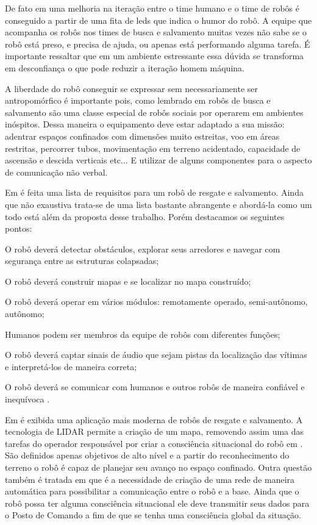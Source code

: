 \documentclass[
	article,			%
	11pt,				%
	oneside,			%
	a4paper,			%
	english,			%
	brazil,				%
	sumario=tradicional	
	]{abntex2}
\begin{document}
De fato em \cite{akgun2022using} uma melhoria na iteração entre o time humano e o time de robôs é conseguido a partir de uma fita de leds que indica o humor do robô. A equipe que acompanha os robôs nos times de busca e salvamento muitas vezes não sabe se o robô está preso, e precisa de ajuda, ou apenas está performando alguma tarefa. É importante ressaltar que em um ambiente estressante essa dúvida se transforma em desconfiança o que pode reduzir a iteração homem máquina.

A liberdade do robô conseguir se expressar sem necessariamente ser antropomórfico é importante pois, como lembrado em \cite{habib2011} robôs de busca e salvamento são uma classe especial de robôs sociais por operarem em ambientes inóspitos. Dessa maneira o equipamento deve estar adaptado a sua missão: adentrar espaços confinados com dimensões muito estreitas, voo em áreas restritas, percorrer tubos, movimentação em terreno acidentado, capacidade de ascensão e descida verticais etc... E utilizar de alguns componentes para o aspecto de comunicação não verbal.

Em \cite{habib2011} é feita uma lista de requisitos para um robô de resgate e salvamento. Ainda que não exaustiva trata-se de uma lista bastante abrangente e abordá-la como um todo está além da proposta desse trabalho. Porém destacamos os seguintes pontos:

\begin{citacao}
O robô deverá detectar obstáculos, explorar seus arredores e navegar com segurança entre as estruturas colapsadas;

O robô deverá construir mapas e se localizar no mapa construído;

O robô deverá operar em vários módulos: remotamente operado, semi-autônomo, autônomo;

Humanos podem ser membros da equipe de robôs com diferentes funções;

O robô deverá captar sinais de áudio que sejam pistas da localização das vítimas e interpretá-los de maneira correta;

O robô deverá se comunicar com humanos e outros robôs de maneira confiável e inequívoca \cite{habib2011}.
\end{citacao}

Em \cite{tardioli2016} é exibida uma aplicação mais moderna de robôs de resgate e salvamento. A tecnologia de LIDAR permite a criação de um mapa, removendo assim uma das tarefas do operador responsável por criar a consciência situacional do robô em \cite{Robin2004}. São definidos apenas objetivos de alto nível e a partir do reconhecimento do terreno o robô é capaz de planejar seu avanço no espaço confinado. Outra questão também é tratada em \cite{tardioli2016} que é a necessidade de criação de uma rede de maneira automática para possibilitar a comunicação entre o robô e a base. Ainda que o robô possa ter alguma consciência situacional ele deve transmitir seus dados para o Posto de Comando a fim de que se tenha uma consciência global da situação.
\end{document}
